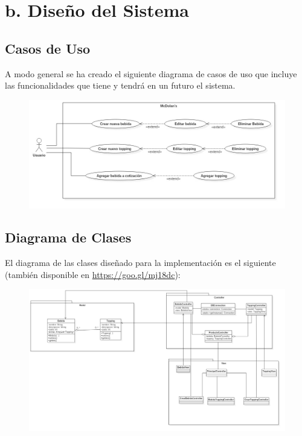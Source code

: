 \documentclass[11pt]{utalcaDoc}
\begin{document}
\section*{b. Diseño del Sistema}

\subsection*{Casos de Uso}

A modo general se ha creado el siguiente diagrama de casos de uso que incluye las funcionalidades que tiene y tendrá en un futuro el sistema.

\begin{figure}[H]
\includegraphics[scale=0.5]{UC.jpg}
\end{figure}


\subsection*{Diagrama de Clases}

El diagrama de las clases diseñado para la implementación es el siguiente (también disponible en \url{https://goo.gl/mj18dc}):
\begin{figure}[H]
\includegraphics[scale=0.3]{CLASS.jpg}
\end{figure} 
\end{document}
